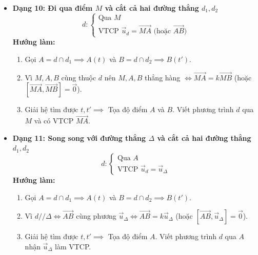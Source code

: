 \documentclass[12pt,a4paper]{article}
\begin{document}
\begin{theorybox}
\begin{itemize}
        \item \textbf{Dạng 10: Đi qua điểm $M$ và cắt cả hai đường thẳng $d_1, d_2$}
        \[
            d\colon \begin{cases} \text{Qua } M \\ \text{VTCP } \vec{u}_d = \vec{MA} \text{ (hoặc } \vec{AB}\text{)} \end{cases}
        \]
        \textbf{Hướng làm:}
        \begin{enumerate}
            \item Gọi $A = d \cap d_1 \implies A(t)$ và $B = d \cap d_2 \implies B(t')$.
            \item Vì $M, A, B$ cùng thuộc $d$ nên $M, A, B$ thẳng hàng $\iff \vec{MA} = k\vec{MB}$ (hoặc $[\vec{MA}, \vec{MB}] = \vec{0}$).
            \item Giải hệ tìm được $t, t' \implies$ Tọa độ điểm $A$ và $B$. Viết phương trình $d$ qua $M$ và có VTCP $\vec{MA}$.
        \end{enumerate}

        \item \textbf{Dạng 11: Song song với đường thẳng $\Delta$ và cắt cả hai đường thẳng $d_1, d_2$}
        \[
            d\colon \begin{cases} \text{Qua } A \\ \text{VTCP } \vec{u}_d = \vec{u}_\Delta \end{cases}
        \]
        \textbf{Hướng làm:}
        \begin{enumerate}
            \item Gọi $A = d \cap d_1 \implies A(t)$ và $B = d \cap d_2 \implies B(t')$.
            \item Vì $d // \Delta \iff \vec{AB}$ cùng phương $\vec{u}_\Delta \iff \vec{AB} = k\vec{u}_\Delta$ (hoặc $[\vec{AB}, \vec{u}_\Delta] = \vec{0}$).
            \item Giải hệ tìm được $t, t' \implies$ Tọa độ điểm $A$. Viết phương trình $d$ qua $A$ nhận $\vec{u}_\Delta$ làm VTCP.
        \end{enumerate}


\end{itemize}
\end{theorybox}
\end{document}
